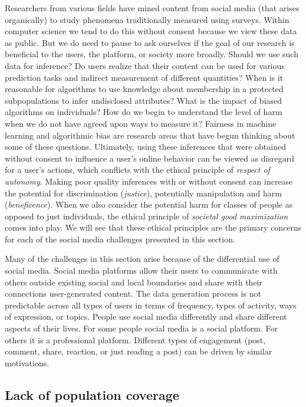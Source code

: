 \documentclass[11pt]{article} %
\begin{document}
Researchers from various fields have mined content from social media (that arises organically) to study phenomena traditionally measured using surveys. Within computer science we tend to do this without consent because we view these data as public. But we do need to pause to ask ourselves if the goal of our research is beneficial to the users, the platform, or society more broadly. Should we use such data for inference? Do users realize that their content can be used for various prediction tasks and indirect measurement of different quantities? When is it reasonable for algorithms to use knowledge about membership in a protected subpopulations to infer undisclosed attributes? What is the impact of biased algorithms on individuals? How do we begin to understand the level of harm when we do not have agreed upon ways to measure it? Fairness in machine learning and algorithmic bias are research areas that have begun thinking about some of these questions. Ultimately, using these inferences that were obtained without consent to influence a user's online behavior can be viewed as disregard for a user's actions, which conflicts with the ethical principle of \textit{respect of autonomy}. Making poor quality inferences with or without consent can increase the potential for discrimination (\textit{justice}), potentially manipulation and harm (\textit{beneficence}). When we also consider the potential harm for classes of people as opposed to just individuals, the ethical principle of \textit{societal good maximization} comes into play. We will see that these ethical principles are the primary concerns for each of the social media challenges presented in this section.

Many of the challenges in this section arise because of the differential use of social media. Social media platforms allow their users to communicate with others outside existing social and local boundaries and share with their connections user-generated content. The data generation process is not predictable across all types of users in terms of frequency, types of activity, ways of expression, or topics. People use social media differently and share different aspects of their lives. For some people social media is a social platform. For others it is a professional platform. Different types of engagement (post, comment, share, reaction, or just reading a post) can be driven by similar motivations.  

\subsection{Lack of population coverage}
\end{document}
